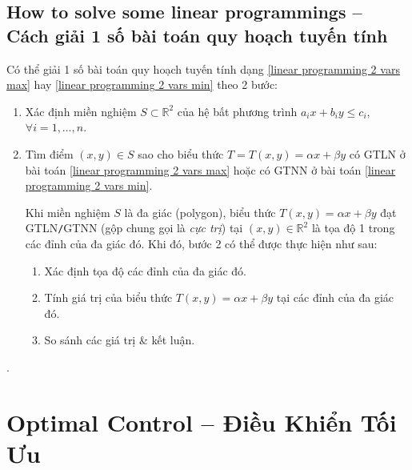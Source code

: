 \documentclass{article}
\begin{document}
\subsection{How to solve some linear programmings -- Cách giải 1 số bài toán quy hoạch tuyến tính}
Có thể giải 1 số bài toán quy hoạch tuyến tính dạng \eqref{linear programming 2 vars max} hay \eqref{linear programming 2 vars min} theo 2 bước:
\begin{enumerate}
	\item Xác định miền nghiệm $S\subset\mathbb{R}^2$ của hệ bất phương trình $a_ix + b_iy\le c_i$, $\forall i = 1,\ldots,n$.
	\item Tìm điểm $(x,y)\in S$ sao cho biểu thức $T = T(x,y) = \alpha x + \beta y$ có {\rm GTLN} ở bài toán \eqref{linear programming 2 vars max} hoặc có {\rm GTNN} ở bài toán \eqref{linear programming 2 vars min}.
	
	Khi miền nghiệm $S$ là đa giác (polygon), biểu thức $T(x,y) = \alpha x + \beta y$ đạt GTLN{\tt/}GTNN (gộp chung gọi là {\it cực trị}) tại $(x,y)\in\mathbb{R}^2$ là tọa độ 1 trong các đỉnh của đa giác đó. Khi đó, bước 2 có thể được thực hiện như sau:
	\begin{enumerate}
		\item Xác định tọa độ các đỉnh của đa giác đó.
		\item Tính giá trị của biểu thức $T(x,y) = \alpha x + \beta y$ tại các đỉnh của đa giác đó.
		\item So sánh các giá trị \& kết luận.
	\end{enumerate}
\end{enumerate}
\cite[Chuyên đề II, \S1, LT1--3, 1., 2., 3., 4., 5., pp. 20--25]{CDHT_Toan_12_Canh_Dieu}.


\section{Optimal Control -- Điều Khiển Tối Ưu}

\end{document}
